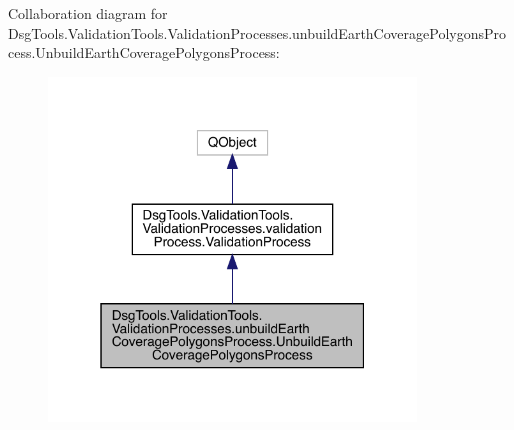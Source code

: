 Collaboration diagram for Dsg\+Tools.\+Validation\+Tools.\+Validation\+Processes.\+unbuild\+Earth\+Coverage\+Polygons\+Process.\+Unbuild\+Earth\+Coverage\+Polygons\+Process\+:
\nopagebreak
\begin{figure}[H]
\begin{center}
\leavevmode
\includegraphics[width=277pt]{class_dsg_tools_1_1_validation_tools_1_1_validation_processes_1_1unbuild_earth_coverage_polygonsc50328e72f3fd78dc0213fe6ca971678}
\end{center}
\end{figure}

